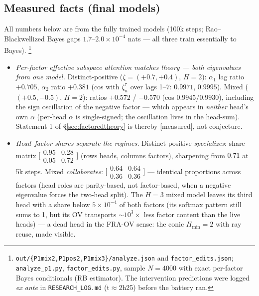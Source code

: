\documentclass{article}
\newcommand{\htag}[1]{{\normalfont\sffamily\footnotesize[#1]}}
\begin{document}
\subsection{Measured facts (final models)}\label{sec:factoredmeas}

All numbers below are from the fully trained models (100k steps;
Rao--Blackwellized Bayes gaps $1.7$--$2.0\times10^{-4}$ nats --- all three train
essentially to Bayes).%
\footnote{\texttt{out/\{P1mix2,P1pos2,P1mix3\}/analyze.json} and
\texttt{factor\_edits.json}; \texttt{analyze\_p1.py}, \texttt{factor\_edits.py},
sample $N{=}4000$ with exact per-factor Bayes conditionals (RB estimator).
The intervention predictions were logged \emph{ex ante} in
\texttt{RESEARCH\_LOG.md} (t${\approx}$2h25) before the battery ran.}

\begin{itemize}
\item \emph{Per-factor effective subspace attention matches theory --- both
eigenvalues from one model.} Distinct-positive ($\zeta=(+0.7,+0.4)$, $H{=}2$):
$\alpha_1$ lag ratio $+0.705$, $\alpha_2$ ratio $+0.381$ (cos with $\zeta_n^\tau$
over lags 1--7: $0.9971$, $0.9995$). Mixed ($(+0.5,-0.5)$, $H{=}2$): ratios
$+0.572$ / $-0.570$ (cos $0.9945$/$0.9930$), including the sign oscillation of the
negative factor --- which appears in \emph{neither} head's own $\alpha$ (per-head
$\alpha$ is single-signed; the oscillation lives in the head-sum). Statement 1 of
\S\ref{sec:factoredtheory} is thereby \htag{measured}, not conjecture.
\item \emph{Head--factor shares separate the regimes.} Distinct-positive
\emph{specializes}: share matrix
$\bigl[\begin{smallmatrix}0.95&0.28\\0.05&0.72\end{smallmatrix}\bigr]$ (rows heads,
columns factors), sharpening from $0.71$ at 5k steps. Mixed \emph{collaborates}:
$\bigl[\begin{smallmatrix}0.64&0.64\\0.36&0.36\end{smallmatrix}\bigr]$ ---
identical proportions across factors (head roles are parity-based, not
factor-based, when a negative eigenvalue forces the two-head split). The $H{=}3$
mixed model leaves its third head with a share below $5\times10^{-4}$ of both
factors (its softmax pattern still sums to 1, but its OV transports
${\sim}10^{3}\times$ less factor content than the live heads) --- a dead head
in the FRA-OV sense: the conic $H_{\min}=2$ with ray reuse, made visible.

\end{itemize}
\end{document}
